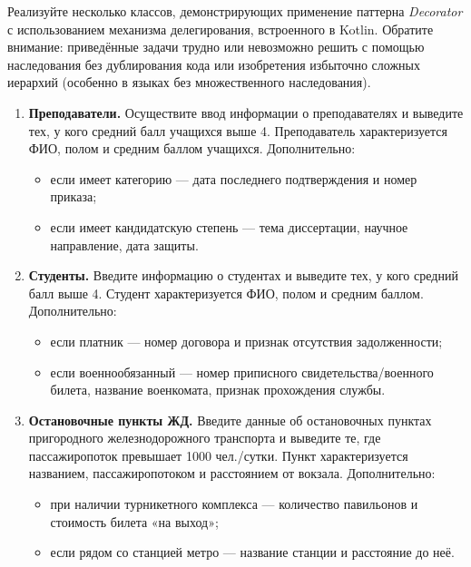 \medskip

Реализуйте несколько классов, демонстрирующих применение паттерна \textit{Decorator} с использованием механизма делегирования, встроенного в Kotlin. Обратите внимание: приведённые задачи трудно или невозможно решить с помощью наследования без дублирования кода или изобретения избыточно сложных иерархий (особенно в языках без множественного наследования).

\begin{enumerate}
    \item \textbf{Преподаватели.}  
    Осуществите ввод информации о преподавателях и выведите тех, у кого средний балл учащихся выше 4.  
    Преподаватель характеризуется ФИО, полом и средним баллом учащихся.  
    Дополнительно:
    \begin{itemize}
        \item если имеет категорию — дата последнего подтверждения и номер приказа;
        \item если имеет кандидатскую степень — тема диссертации, научное направление, дата защиты.
    \end{itemize}

    \item \textbf{Студенты.}  
    Введите информацию о студентах и выведите тех, у кого средний балл выше 4.  
    Студент характеризуется ФИО, полом и средним баллом.  
    Дополнительно:
    \begin{itemize}
        \item если платник — номер договора и признак отсутствия задолженности;
        \item если военнообязанный — номер приписного свидетельства/военного билета, название военкомата, признак прохождения службы.
    \end{itemize}

    \item \textbf{Остановочные пункты ЖД.}  
    Введите данные об остановочных пунктах пригородного железнодорожного транспорта и выведите те, где пассажиропоток превышает 1000 чел./сутки.  
    Пункт характеризуется названием, пассажиропотоком и расстоянием от вокзала.  
    Дополнительно:
    \begin{itemize}
        \item при наличии турникетного комплекса — количество павильонов и стоимость билета «на выход»;
        \item если рядом со станцией метро — название станции и расстояние до неё.
    \end{itemize}


\end{enumerate}
